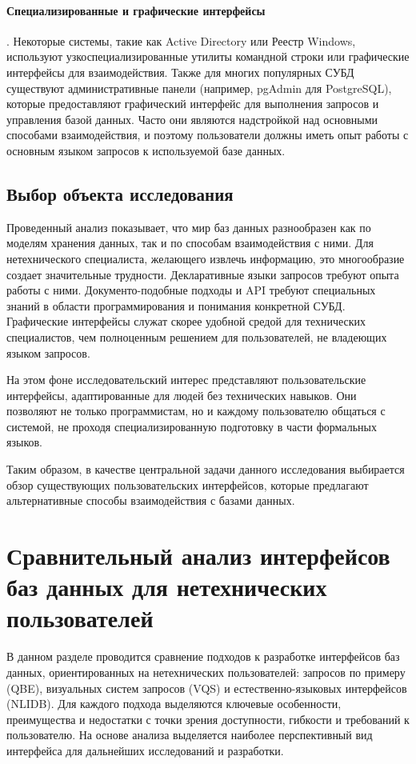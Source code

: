 \paragraph{Специализированные и графические интерфейсы}.
Некоторые системы, такие как Active Directory или Реестр Windows, используют узкоспециализированные
утилиты командной строки или графические интерфейсы для взаимодействия.
Также для многих популярных СУБД существуют административные панели
(например, pgAdmin для PostgreSQL), которые предоставляют графический интерфейс для
выполнения запросов и управления базой данных. Часто они являются надстройкой над основными способами взаимодействия,
и поэтому пользователи должны иметь опыт работы с основным языком запросов к используемой базе данных.




\subsection{Выбор объекта исследования}

Проведенный анализ показывает, что мир баз данных разнообразен как по моделям хранения данных,
так и по способам взаимодействия с ними. Для нетехнического специалиста, желающего извлечь информацию,
это многообразие создает значительные трудности.
Декларативные языки запросов требуют опыта работы с ними.
Документо-подобные подходы и API требуют специальных знаний в области программирования
и понимания конкретной СУБД. Графические интерфейсы служат скорее удобной средой для
технических специалистов, чем полноценным решением для пользователей, не владеющих
языком запросов.

На этом фоне исследовательский интерес представляют
пользовательские интерфейсы, адаптированные для людей без технических навыков. Они позволяют
не только программистам, но и каждому пользователю общаться с системой, не проходя специализированную
подготовку в части формальных языков.

Таким образом, в качестве центральной задачи данного исследования выбирается обзор существующих
пользовательских интерфейсов, которые предлагают альтернативные способы взаимодействия
с базами данных.




\section{Сравнительный анализ интерфейсов баз данных для нетехнических пользователей}
\begin{annotation}
      В данном разделе проводится сравнение подходов к разработке интерфейсов баз данных,
      ориентированных на нетехнических пользователей: запросов по примеру (QBE), визуальных систем запросов (VQS) и
      естественно-языковых интерфейсов (NLIDB).
      Для каждого подхода выделяются ключевые особенности,
      преимущества и недостатки с точки зрения доступности, гибкости и требований к пользователю.
      На основе анализа выделяется наиболее перспективный вид интерфейса для дальнейших исследований и разработки.
\end{annotation}




